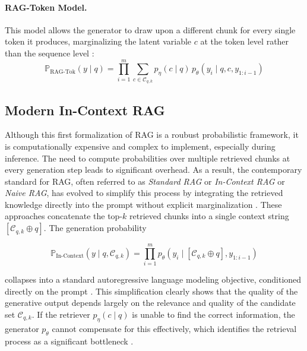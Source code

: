 \paragraph{RAG-Token Model.} 
This model allows the generator to draw upon a different chunk for every single token it produces, marginalizing the latent variable $c$ at the token level rather than the sequence level \cite{lewis_rag_2020}:
\begin{equation}
    \mathbb{P}_{\text{RAG-Tok}}(y \mid q) = \prod_{i=1}^m \sum_{c \in \mathcal{C}_{q,k}} p_\eta(c \mid q) \, p_\theta(y_i \mid q, c, y_{1:i-1})
\end{equation}


\subsection{Modern In-Context RAG}
\label{sec:rag_modern}

Although this first formalization of \ac{RAG} is a roubust probabilistic framework, it is computationally expensive and complex to implement, especially during inference. The need to compute probabilities over multiple retrieved chunks at every generation step leads to significant overhead. As a result, the contemporary standard for \ac{RAG}, often referred to as \emph{Standard \ac{RAG}} or \emph{In-Context \ac{RAG}} or \emph{Naive \ac{RAG}}, has evolved to simplify this process by integrating the retrieved knowledge directly into the prompt without explicit marginalization \cite{gao_2024_rag}. These approaches concatenate the top-$k$ retrieved chunks into a single context string $[\mathcal{C}_{q,k} \oplus q]$. The generation probability

\begin{equation}
    \mathbb{P}_{\text{In-Context}}(y \mid q, \mathcal{C}_{q,k}) = \prod_{i=1}^m p_\theta(y_i \mid [\mathcal{C}_{q,k} \oplus q], y_{1:i-1})
\end{equation}

collapses into a standard autoregressive language modeling objective, conditioned directly on the prompt \cite{ram-2023-context}. This simplification clearly shows that the quality of the generative output depends largely on the relevance and quality of the candidate set $\mathcal{C}_{q,k}$. If the retriever $p_\eta(c \mid q)$ is unable to find the correct information, the generator $p_\theta$ cannot compensate for this effectively, which identifies the retrieval process as a significant bottleneck \cite{barnett2024seven, Yoran2023MakingRL, shi-etal-2025-making}.



